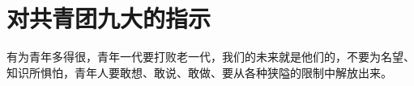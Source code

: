 \section[对共青团九大的指示（一九六四年）]{对共青团九大的指示}


有为青年多得很，青年一代要打败老一代，我们的未来就是他们的，不要为名望、知识所惧怕，青年人要敢想、敢说、敢做、要从各种狭隘的限制中解放出来。

